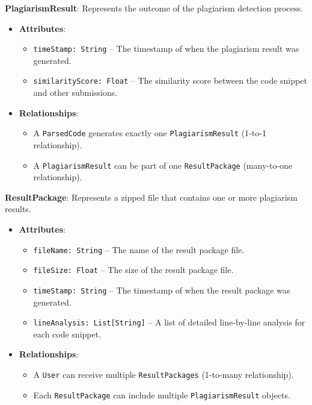 \documentclass[12pt]{article}
\begin{document}
\textbf{PlagiarismResult}: Represents the outcome of the plagiarism detection process.
\begin{itemize}
    \item \textbf{Attributes}:
    \begin{itemize}
        \item \texttt{timeStamp: String} -- The timestamp of when the plagiarism result was generated.
        \item \texttt{similarityScore: Float} -- The similarity score between the code snippet and other submissions.
    \end{itemize}
    \item \textbf{Relationships}:
    \begin{itemize}
        \item A \texttt{ParsedCode} generates exactly one \texttt{PlagiarismResult} (1-to-1 relationship).
        \item A \texttt{PlagiarismResult} can be part of one \texttt{ResultPackage} (many-to-one relationship).
    \end{itemize}
\end{itemize}

\textbf{ResultPackage}: Represents a zipped file that contains one or more plagiarism results.
\begin{itemize}
    \item \textbf{Attributes}:
    \begin{itemize}
        \item \texttt{fileName: String} -- The name of the result package file.
        \item \texttt{fileSize: Float} -- The size of the result package file.
        \item \texttt{timeStamp: String} -- The timestamp of when the result package was generated.
        \item \texttt{lineAnalysis: List[String]} -- A list of detailed line-by-line analysis for each code snippet.
    \end{itemize}
    \item \textbf{Relationships}:
    \begin{itemize}
        \item A \texttt{User} can receive multiple \texttt{ResultPackages} (1-to-many relationship).
        \item Each \texttt{ResultPackage} can include multiple \texttt{PlagiarismResult} objects.
    \end{itemize}
\end{itemize}
\end{document}

